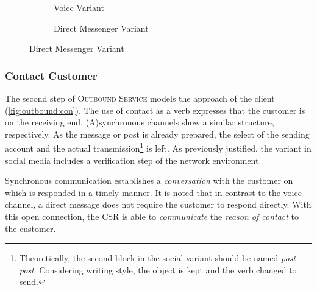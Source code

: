 \begin{figure}[caption={Prepare Contact Detail Process}, label={fig:outbound:prep}]
\begin{subfigure}[b]{.45\textwidth}
\begin{tikzpicture}
	 		\end{tikzpicture}
	 		\caption{Voice Variant}\label{fig:outbound:prep:voice}
	 	\end{subfigure}
	 	\begin{subfigure}[b]{.45\textwidth}
	 		\centering	
	 		\caption{Direct Messenger Variant}\label{fig:outbound:prep:dm}
	 	\end{subfigure}
	 \end{figure}
	 
	 
	 \subsubsection{Contact Customer}
	 
	 The second step of \textsc{Outbound Service} models the approach of the client (\Fig \ref{fig:outbound:con}). The use of contact as a verb expresses that the customer is on the receiving end. (A)synchronous channels show a similar structure, respectively. As the message or post is already prepared, the select of the sending account and the actual transmission\footnote{Theoretically, the second block in the social variant should be named \textit{post post}. Considering writing style, the object is kept and the verb changed to send. } is left. As previously justified, the variant in social media includes a verification step of the network environment. 
	 
	 Synchronous communication establishes a \textit{conversation} with the customer on which is responded in a timely manner. It is noted that in contrast to the voice channel, a direct message does not require the customer to respond directly. With this open connection, the  \acrshort{CSR} is able to \textit{communicate} the \textit{reason of contact} to the customer. 
	 
